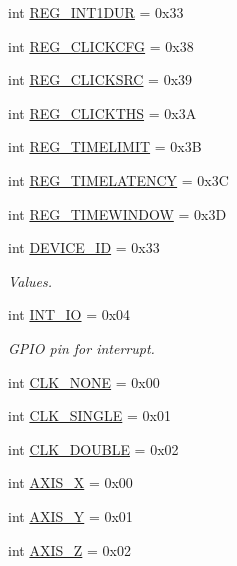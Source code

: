 \begin{DoxyCompactItemize}
int \mbox{\hyperlink{classlis3dh_1_1_l_i_s3_d_h_a3720a84f0c74826c05a497545cdf6710}{R\+E\+G\+\_\+\+I\+N\+T1\+D\+UR}} = 0x33
\item 
int \mbox{\hyperlink{classlis3dh_1_1_l_i_s3_d_h_ac278ebdacc90a85a0f8f06722e0b6128}{R\+E\+G\+\_\+\+C\+L\+I\+C\+K\+C\+FG}} = 0x38
\item 
int \mbox{\hyperlink{classlis3dh_1_1_l_i_s3_d_h_a0ac8fe95a8900177cacc66ef4179ed22}{R\+E\+G\+\_\+\+C\+L\+I\+C\+K\+S\+RC}} = 0x39
\item 
int \mbox{\hyperlink{classlis3dh_1_1_l_i_s3_d_h_ac554a8b9fbc2257d415fa72da2eccaeb}{R\+E\+G\+\_\+\+C\+L\+I\+C\+K\+T\+HS}} = 0x3A
\item 
int \mbox{\hyperlink{classlis3dh_1_1_l_i_s3_d_h_a12b81faa9600c94692e1ee49766013ee}{R\+E\+G\+\_\+\+T\+I\+M\+E\+L\+I\+M\+IT}} = 0x3B
\item 
int \mbox{\hyperlink{classlis3dh_1_1_l_i_s3_d_h_a62595a027517ad7b6dc5041b2ffd7889}{R\+E\+G\+\_\+\+T\+I\+M\+E\+L\+A\+T\+E\+N\+CY}} = 0x3C
\item 
int \mbox{\hyperlink{classlis3dh_1_1_l_i_s3_d_h_aac44f50678b56bd87fa0f737ca952e67}{R\+E\+G\+\_\+\+T\+I\+M\+E\+W\+I\+N\+D\+OW}} = 0x3D
\item 
int \mbox{\hyperlink{classlis3dh_1_1_l_i_s3_d_h_a89662cd2d30917b095e8ab44f75e7c2b}{D\+E\+V\+I\+C\+E\+\_\+\+ID}} = 0x33
\begin{DoxyCompactList}\small\item\em Values. \end{DoxyCompactList}\item 
int \mbox{\hyperlink{classlis3dh_1_1_l_i_s3_d_h_a79638098f4ab776bee94d8d81882d96d}{I\+N\+T\+\_\+\+IO}} = 0x04
\begin{DoxyCompactList}\small\item\em G\+P\+IO pin for interrupt. \end{DoxyCompactList}\item 
int \mbox{\hyperlink{classlis3dh_1_1_l_i_s3_d_h_ad8988e0114360d61cd9de6aebd7f0368}{C\+L\+K\+\_\+\+N\+O\+NE}} = 0x00
\item 
int \mbox{\hyperlink{classlis3dh_1_1_l_i_s3_d_h_a5c335c1a5da24345336c93d9a7a94b1a}{C\+L\+K\+\_\+\+S\+I\+N\+G\+LE}} = 0x01
\item 
int \mbox{\hyperlink{classlis3dh_1_1_l_i_s3_d_h_aa77e1a98a28e557c6e27c7c15c3bc4cb}{C\+L\+K\+\_\+\+D\+O\+U\+B\+LE}} = 0x02
\item 
int \mbox{\hyperlink{classlis3dh_1_1_l_i_s3_d_h_a80412558dee29ba410fd08f0b5da665e}{A\+X\+I\+S\+\_\+X}} = 0x00
\item 
int \mbox{\hyperlink{classlis3dh_1_1_l_i_s3_d_h_a4745227bae066167c2793750ad379f5d}{A\+X\+I\+S\+\_\+Y}} = 0x01
\item 
int \mbox{\hyperlink{classlis3dh_1_1_l_i_s3_d_h_aa94d85ba1f91f49326bc56d28a7942f3}{A\+X\+I\+S\+\_\+Z}} = 0x02
\end{DoxyCompactItemize}


